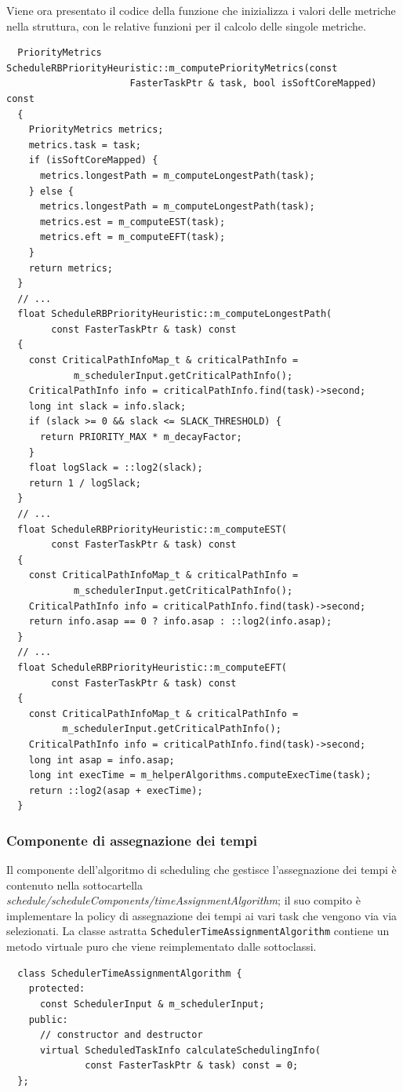 Viene ora presentato il codice della funzione che inizializza i valori delle 
metriche nella struttura, con le relative funzioni per il calcolo delle singole 
metriche.
\newline
\begin{verbatim}
  PriorityMetrics ScheduleRBPriorityHeuristic::m_computePriorityMetrics(const 
                      FasterTaskPtr & task, bool isSoftCoreMapped) const
  {
    PriorityMetrics metrics;
    metrics.task = task;
    if (isSoftCoreMapped) {
      metrics.longestPath = m_computeLongestPath(task);
    } else {
      metrics.longestPath = m_computeLongestPath(task);
      metrics.est = m_computeEST(task);
      metrics.eft = m_computeEFT(task);
    }
    return metrics;
  }
  // ...
  float ScheduleRBPriorityHeuristic::m_computeLongestPath(
        const FasterTaskPtr & task) const
  {
    const CriticalPathInfoMap_t & criticalPathInfo = 
            m_schedulerInput.getCriticalPathInfo();
    CriticalPathInfo info = criticalPathInfo.find(task)->second;
    long int slack = info.slack;
    if (slack >= 0 && slack <= SLACK_THRESHOLD) {
      return PRIORITY_MAX * m_decayFactor;
    }
    float logSlack = ::log2(slack);
    return 1 / logSlack;
  }
  // ...
  float ScheduleRBPriorityHeuristic::m_computeEST(
        const FasterTaskPtr & task) const
  {
    const CriticalPathInfoMap_t & criticalPathInfo = 
            m_schedulerInput.getCriticalPathInfo();
    CriticalPathInfo info = criticalPathInfo.find(task)->second;
    return info.asap == 0 ? info.asap : ::log2(info.asap);
  }
  // ...
  float ScheduleRBPriorityHeuristic::m_computeEFT(
        const FasterTaskPtr & task) const
  {
    const CriticalPathInfoMap_t & criticalPathInfo = 
          m_schedulerInput.getCriticalPathInfo();
    CriticalPathInfo info = criticalPathInfo.find(task)->second;
    long int asap = info.asap;
    long int execTime = m_helperAlgorithms.computeExecTime(task);
    return ::log2(asap + execTime);
  }
\end{verbatim}


\subsubsection{Componente di assegnazione dei tempi}
Il componente dell'algoritmo di scheduling che gestisce l'assegnazione dei 
tempi è contenuto nella sottocartella 
\emph{schedule/scheduleComponents/timeAssignmentAlgorithm}; il suo compito è 
implementare la policy di assegnazione dei tempi ai vari task che vengono via 
via selezionati. La classe astratta \verb+SchedulerTimeAssignmentAlgorithm+ 
contiene un metodo virtuale puro che viene reimplementato dalle sottoclassi.
\newline
\begin{verbatim}
  class SchedulerTimeAssignmentAlgorithm {
    protected:
      const SchedulerInput & m_schedulerInput;
    public:
      // constructor and destructor
      virtual ScheduledTaskInfo calculateSchedulingInfo(
              const FasterTaskPtr & task) const = 0;
  };
\end{verbatim}

